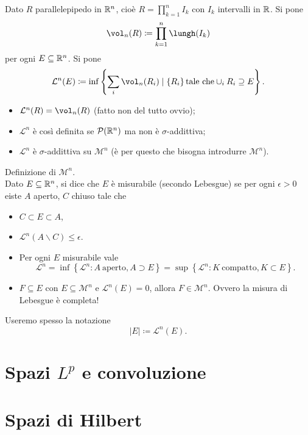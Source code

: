 \documentclass[a4paper, 11pt]{report}
\begin{document}
Dato $R$ parallelepipedo in $\mathbb R^n$, cioè $R = \prod_{k=1}^{n} I_k $ con $I_k$ intervalli in $\mathbb R$.
Si pone
\[
\vol_{n} (R) \coloneqq \prod_{k=1}^{n}  \lungh (I_k)
\] 
per ogni $E \subseteq \mathbb R^n$. Si pone
\[
\mathcal{L}^n(E) \coloneqq \inf \left\{ \sum_{i}^{} \vol_n (R_i) \mid \left\{ R_i \right\} \text{tale che} \cup_i R_i \supseteq E  \right\}.
\] 
\begin{osservazione}
\begin{itemize}
\item $\mathcal{L}^n(R) = \vol_n (R)$ (fatto non del tutto ovvio);
\item $\mathcal{L}^n$ è così definita se $\mathcal{P}(\mathbb R^n)$ ma non è $\sigma$-addittiva;
\item $\mathcal{L}^n$ è $\sigma$-addittiva su $\mathcal{M}^n$ (è per questo che bisogna introdurre $\mathcal{M}^n$).
\end{itemize}
\end{osservazione}
%
Definizione di $\mathcal{M}^n$. \\
Dato $E \subseteq \mathbb R^n$, si dice che $E$ è misurabile (secondo Lebesgue) se per ogni $\epsilon > 0$ eiste $A$ aperto, $C$ chiuso tale che
\begin{itemize}
\item $C \subset E \subset A$,
\item $\mathcal{L}^n (A \smallsetminus C) \leq \epsilon$.
\end{itemize}
%
\begin{osservazione}
\begin{itemize}
\item Per ogni $E$ misurabile vale
\[
\mathcal{L}^n = \inf \left\{ \mathcal{L}^n \colon A \ \text{aperto}, A \supset E \right\} = \sup \left\{ \mathcal{L}^n \colon K \ \text{compatto}, K \subset E \right\}.
\] 
\item $F \subseteq E$ con $E \subseteq \mathcal{M}^n$ e $\mathcal{L}^n(E) = 0$, allora $F \in \mathcal{M}^n$. Ovvero la misura di Lebesgue è completa!
\end{itemize}
%
Useremo spesso la notazione
\[
\left| E \right| \coloneqq \mathcal{L}^n (E).
\] 
\end{osservazione}

\chapter{Spazi $L^p$ e convoluzione}


\chapter{Spazi di Hilbert}
\end{document}
